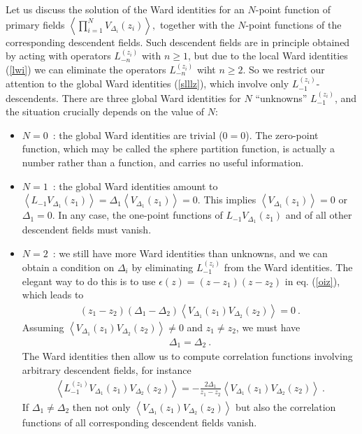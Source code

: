 \documentclass[12pt,a4paper,notitlepage]{report}
\newcommand \la {\left\langle}
\newcommand \ra {\right\rangle}
\numberwithin{equation}{section}
\theoremstyle{break}
\begin{document}
Let us discuss the solution of the Ward identities for an $N$-point function of primary fields
$
\la \prod_{i=1}^N V_{\Delta_i}(z_i) \ra ,
$
together with the $N$-point functions of the corresponding descendent fields. Such descendent fields are in principle obtained by acting with operators $L_{-n}^{(z_i)}$ with $n\geq 1$, but due to the local Ward identities (\ref{lwi}) we can eliminate the operators $L_{-n}^{(z_i)}$ wiht $n\geq 2$. So we restrict our attention to the global Ward identities (\ref{slllz}), which involve only $L_{-1}^{(z_i)}$-descendents. There are three global Ward identities for $N$ ``unknowns'' $L_{-1}^{(z_i)}$, and the situation crucially depends on the value of $N$:
\begin{itemize}
 \item $\boxed{N=0}$\ : the global Ward identities are trivial ($0=0$). The zero-point function, which may be called the sphere partition function, is actually a number rather than a function, and carries no useful information.
\item $\boxed{N=1}$\ :  the global Ward identities amount to $\la L_{-1}V_{\Delta_1}(z_1)\ra  =\Delta_1 \la V_{\Delta_1}(z_1)\ra =0$. This implies $\la V_{\Delta_1}(z_1)\ra=0$ or $\Delta_1=0$. In any case, the one-point functions of $L_{-1}V_{\Delta_1}(z_1)$ and of all other descendent fields must vanish. 
\item $\boxed{N=2}$\ : we still have more Ward identities than unknowns, and we can obtain a condition on $\Delta_i$ by eliminating $L_{-1}^{(z_i)}$ from the Ward identities. The elegant way to do this is to use $\epsilon(z)=(z-z_1)(z-z_2)$ in eq. (\ref{oiz}), which leads to 
\begin{align}
 (z_1-z_2)(\Delta_1-\Delta_2)\la V_{\Delta_1}(z_1)V_{\Delta_2}(z_2)\ra =0\ .
\end{align}
Assuming $\la V_{\Delta_1}(z_1)V_{\Delta_2}(z_2)\ra\neq 0$ and $z_1\neq z_2$, we must have 
\begin{align}
 \Delta_1 = \Delta_2 \ . 
\label{ded}
\end{align}
The Ward identities then allow us to compute correlation functions involving arbitrary descendent fields, for instance 
\begin{align}
  \la L_{-1}^{(z_1)}V_{\Delta_1}(z_1)V_{\Delta_2}(z_2)\ra= -\frac{2\Delta_1}{z_1-z_2}\la V_{\Delta_1}(z_1)V_{\Delta_2}(z_2)\ra \ .
\label{lzfz}
\end{align}
If $\Delta_1\neq \Delta_2$ then not only $\la V_{\Delta_1}(z_1)V_{\Delta_2}(z_2)\ra$ but also the correlation functions of all corresponding descendent fields vanish. 

\end{itemize}
\end{document}
